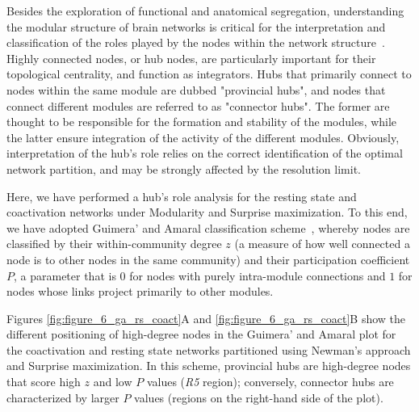 Besides the exploration of functional and anatomical segregation, understanding the modular structure of brain networks is critical for the interpretation and classification of the roles played by the nodes within the network structure~\cite{sporns2007}. Highly connected nodes, or hub nodes, are particularly important for their topological centrality, and function as integrators. Hubs that primarily connect to nodes within the same module are dubbed "provincial hubs", and nodes that connect different modules are referred to as "connector hubs". The former are thought to be responsible for the formation and stability of the modules, while the latter ensure integration of the activity of the different modules. Obviously, interpretation of the hub's role relies on the correct identification of the optimal network partition, and may be strongly affected by the resolution limit.

Here, we have performed a hub's role analysis for the resting state and coactivation networks under Modularity and Surprise maximization.
To this end, we have adopted Guimera' and Amaral classification scheme~\cite{guimera2005}, whereby nodes are classified by their within-community degree $z$ (a measure of how well connected a node is to other nodes in the same community) and their participation coefficient $P$, a parameter that is $0$ for nodes with purely intra-module connections and $1$ for nodes whose links project primarily to other modules. 

Figures \ref{fig:figure_6_ga_rs_coact}A and \ref{fig:figure_6_ga_rs_coact}B show the different positioning of high-degree nodes in the Guimera' and Amaral plot for the coactivation and resting state networks partitioned using Newman’s approach and Surprise maximization. In this scheme, provincial hubs are high-degree nodes that score high $z$ and low $P$ values (\emph{R5} region); conversely, connector hubs are characterized by larger $P$ values (regions on the right-hand side of the plot).

